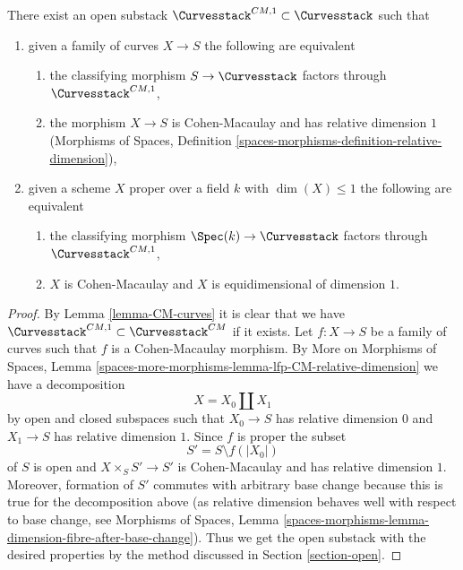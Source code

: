 \begin{lemma}
\label{lemma-CM-1-curves}
There exist an open substack $\Curvesstack^{CM, 1} \subset \Curvesstack$
such that
\begin{enumerate}
\item given a family of curves $X \to S$ the following are equivalent
\begin{enumerate}
\item the classifying morphism $S \to \Curvesstack$ factors
through $\Curvesstack^{CM, 1}$,
\item the morphism $X \to S$ is Cohen-Macaulay and has
relative dimension $1$ (Morphisms of Spaces, Definition
\ref{spaces-morphisms-definition-relative-dimension}),
\end{enumerate}
\item given a scheme $X$ proper over a field $k$ with $\dim(X) \leq 1$
the following are equivalent
\begin{enumerate}
\item the classifying morphism $\Spec(k) \to \Curvesstack$ factors
through $\Curvesstack^{CM, 1}$,
\item $X$ is Cohen-Macaulay and $X$ is equidimensional of
dimension $1$.
\end{enumerate}
\end{enumerate}
\end{lemma}

\begin{proof}
By Lemma \ref{lemma-CM-curves} it is clear that we have
$\Curvesstack^{CM, 1} \subset \Curvesstack^{CM}$
if it exists. Let $f : X \to S$ be a family of curves
such that $f$ is a Cohen-Macaulay morphism. By
More on Morphisms of Spaces, Lemma
\ref{spaces-more-morphisms-lemma-lfp-CM-relative-dimension}
we have a decomposition
$$
X = X_0 \amalg X_1
$$
by open and closed subspaces such that $X_0 \to S$ has relative
dimension $0$ and $X_1 \to S$ has relative dimension $1$.
Since $f$ is proper the subset
$$
S' = S \setminus f(|X_0|)
$$
of $S$ is open and $X \times_S S' \to S'$ is Cohen-Macaulay
and has relative dimension $1$.
Moreover, formation of $S'$ commutes with arbitrary base
change because this is true for the decomposition above
(as relative dimension behaves well with respect to base
change, see Morphisms of Spaces, Lemma
\ref{spaces-morphisms-lemma-dimension-fibre-after-base-change}).
Thus we get the open substack with the desired properties
by the method discussed in Section \ref{section-open}.
\end{proof}







